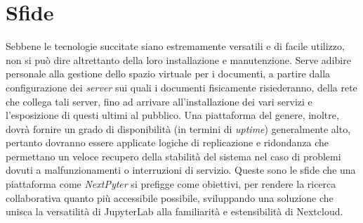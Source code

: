 \newpage
\section{Sfide}
Sebbene le tecnologie succitate siano estremamente versatili e di facile utilizzo, non si può dire altrettanto della loro installazione e manutenzione. Serve adibire personale alla gestione dello spazio virtuale per i documenti, a partire dalla configurazione dei \textit{server} sui quali i documenti fisicamente risiederanno, della rete che collega tali server, fino ad arrivare all'installazione dei vari servizi e l'esposizione di questi ultimi al pubblico.\newline
Una piattaforma del genere, inoltre, dovrà fornire un grado di disponibilità (in termini di \textit{uptime}) generalmente alto, pertanto dovranno essere applicate logiche di replicazione e ridondanza che permettano un veloce recupero della stabilità del sistema nel caso di problemi dovuti a malfunzionamenti o interruzioni di servizio.
\newline
Queste sono le sfide che una piattaforma come \textit{NextPyter} si prefigge come obiettivi, per rendere la ricerca collaborativa quanto più accessibile possibile, sviluppando una soluzione che unisca la versatilità di JupyterLab alla familiarità e estensibilità di Nextcloud.